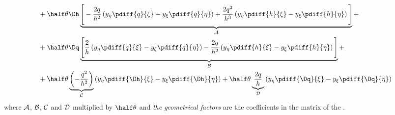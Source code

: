 {{\begin{align}
            & + \half \theta \Dh  \underbrace{\Bigg[
                -\frac{2q}{h^2} \left( y_\eta \pdiff{q}{\xi} - y_\xi \pdiff{q}{\eta} \right)
                + \frac{2q^2}{h^3} \left( y_\eta \pdiff{h}{\xi} - y_\xi \pdiff{h}{\eta} \right)
                \Bigg]}_{\cal A} +
            \\*
            & + \half \theta \Dq \underbrace{\Bigg[
                \frac{2}{h} \left( y_\eta \pdiff{q}{\xi} - y_\xi \pdiff{q}{\eta} \right)
                - \frac{2q}{h^2} \left( y_\eta \pdiff{h}{\xi} - y_\xi \pdiff{h}{\eta} \right)
                \Bigg]}_{\cal B} +
            \\*
            & +\half \theta \underbrace{\left(-\frac{q^2}{h^2}\right)}_{\cal C} \left(  y_\eta \pdiff{\Dh}{\xi} - y_\xi \pdiff{\Dh}{\eta} \right)
            +
            \half \theta \underbrace{\frac{2q}{h}}_{\cal D} \left( y_\eta \pdiff{\Dq}{\xi} - y_\xi \pdiff{\Dq}{\eta} \right)
        \end{align}
        where $\cal{A}$, $\cal{B}$, $\cal{C}$ and $\cal{D}$ multiplied by $\half\theta$ and \emph{the geometrical factors} are the coefficients in the matrix of the \deltaformulation.

}}
